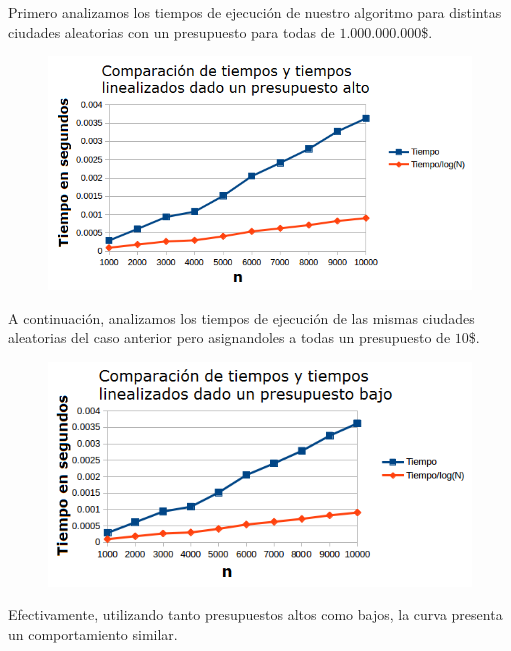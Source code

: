 Primero analizamos los tiempos de ejecuci\'on de nuestro algoritmo para distintas ciudades aleatorias con un presupuesto para todas de $1.000.000.000$\$.
 \begin{figure}[h!]
   \begin{center}
 	\includegraphics[scale=0.8]{imagenes/ej1/Mediciones/Grafico3.png}
   \end{center}
 \end{figure}


 A continuaci\'on, analizamos los tiempos de ejecuci\'on de las mismas ciudades aleatorias del caso anterior pero asignandoles a todas un presupuesto de $10$\$.
  \begin{figure}[h!]
   \begin{center}
 	\includegraphics[scale=0.9]{imagenes/ej1/Mediciones/Grafico4.png}
   \end{center}
 \end{figure}
 
 \newpage
Efectivamente, utilizando tanto presupuestos altos como bajos, la curva presenta un comportamiento similar.

